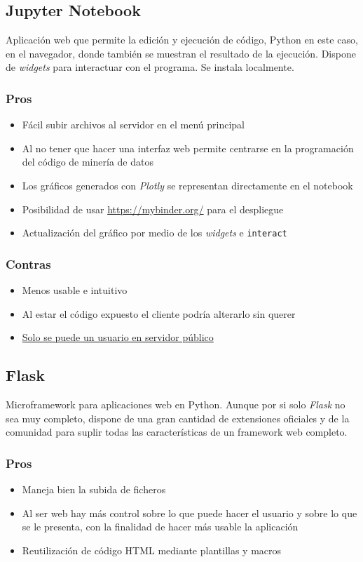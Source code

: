 \subsection{Jupyter Notebook}
Aplicación web que permite la edición y ejecución de código, Python en este
caso, en el navegador, donde también se muestran el resultado de la ejecución.
Dispone de \textit{widgets} para interactuar con el programa. Se instala
localmente.
\subsubsection{Pros}
\begin{itemize}
	\item Fácil subir archivos al servidor en el menú principal
	\item Al no tener que hacer una interfaz web permite centrarse en la
	programación del código de minería de datos
	\item Los gráficos generados con \textit{Plotly} se representan directamente en
	el notebook
	\item Posibilidad de usar \url{https://mybinder.org/} para el despliegue
	\item Actualización del gráfico por medio de los \textit{widgets} e
	\verb|interact|
\end{itemize}
\subsubsection{Contras}
\begin{itemize}
	\item Menos usable e intuitivo
	\item Al estar el código expuesto el cliente podría alterarlo sin querer
	\item
	\href{http://jupyter-notebook.readthedocs.io/en/latest/public_server.html}{Solo
		se puede un usuario en servidor público}
\end{itemize}

\subsection{Flask}
Microframework para aplicaciones web en Python. Aunque por si solo
\textit{Flask} no sea muy completo, dispone de una gran cantidad de extensiones
oficiales y de la comunidad para suplir todas las características de un
framework web completo.
\subsubsection{Pros}
\begin{itemize}
	\item Maneja bien la subida de ficheros
	\item Al ser web hay más control sobre lo que puede hacer el usuario y sobre lo
	que se le presenta, con la finalidad de hacer más usable la aplicación
	\item Reutilización de código HTML mediante plantillas y macros
\end{itemize}

